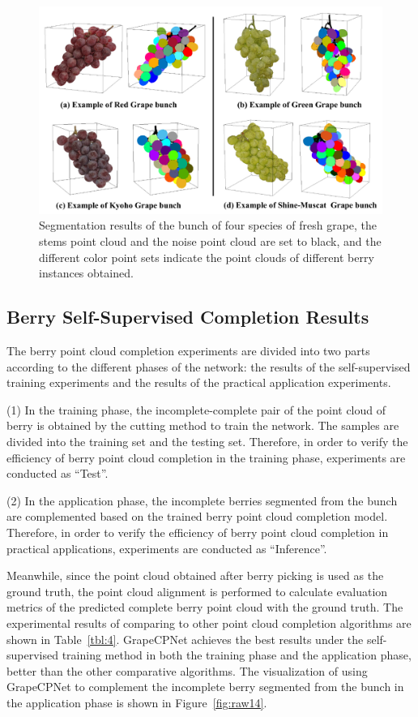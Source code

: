 \documentclass[12pt]{article}
\begin{document}
\begin{figure}[hbt!]
    \centering
    \includegraphics[width=1\textwidth]{figures/Figure11.pdf}
    \caption{Segmentation results of the bunch of four species of fresh grape, the stems point cloud and the noise point cloud are set to black, and the different color point sets indicate the point clouds of different berry instances obtained.}
    \label{fig:raw13}
\end{figure}

\subsection{Berry Self-Supervised Completion Results}

The berry point cloud completion experiments are divided into two parts according to the different phases of the network: the results of the self-supervised training experiments and the results of the practical application experiments.

(1) In the training phase, the incomplete-complete pair of the point cloud of berry is obtained by the cutting method to train the network. 
The samples are divided into the training set and the testing set. Therefore, in order to verify the efficiency of berry point cloud completion in the training phase, experiments are conducted as ``Test''.

(2) In the application phase, the incomplete berries segmented from the bunch are complemented based on the trained berry point cloud completion model. 
Therefore, in order to verify the efficiency of berry point cloud completion in practical applications, experiments are conducted as ``Inference''. 


Meanwhile, since the point cloud obtained after berry picking is used as the ground truth, the point cloud alignment is performed to calculate evaluation metrics of the predicted complete berry point cloud with the ground truth.
The experimental results of comparing to other point cloud completion algorithms are shown in Table~\ref{tbl:4}. 
GrapeCPNet achieves the best results under the self-supervised training method in both the training phase and the application phase, better than the other comparative algorithms. 
The visualization of using GrapeCPNet to complement the incomplete berry segmented from the bunch in the application phase is shown in Figure~\ref{fig:raw14}.
\end{document}
